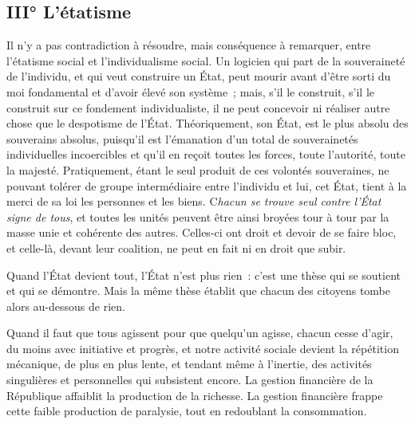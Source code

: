 \documentclass[french,twoside]{book} %
\newcommand{\astermono}{\medskip\centerline{\color{rubric}\large\selectfont{\syms ✻}}\medskip\par}%
\begin{document}
\astermono

\subsection[{III° L’étatisme}]{III° L’étatisme}
\noindent Il n’y a pas contradiction à résoudre, mais conséquence à remarquer, entre l’étatisme social et l’individualisme social. Un logicien qui part de la souveraineté de l’individu, et qui veut construire un État, peut mourir avant d’être sorti du moi fondamental et d’avoir élevé son système ; mais, s’il le construit, s’il le construit sur ce fondement individualiste, il ne peut concevoir ni réaliser autre chose que le despotisme de l’État. Théoriquement, son État, est le plus absolu des souverains absolus, puisqu’il est l’émanation d’un total de souverainetés individuelles incoercibles et qu’il en reçoit toutes les forces, toute l’autorité, toute la majesté. Pratiquement, étant le seul produit de ces volontés souveraines, ne pouvant tolérer de groupe intermédiaire entre l’individu et lui, cet État, tient à la merci de sa loi les personnes et les biens. C\emph{hacun se trouve seul contre l’État signe de tous}, et toutes les unités peuvent être ainsi broyées tour à tour par la masse unie et cohérente des autres. Celles-ci ont droit et devoir de se faire bloc, et celle-là, devant leur coalition, ne peut en fait ni en droit que subir.\par

\astermono

\noindent Quand l’État devient tout, l’État n’est plus rien : c’est une thèse qui se soutient et qui se démontre. Mais la même thèse établit que chacun des citoyens tombe alors au-dessous de rien.\par
Quand il faut que tous agissent pour que quelqu’un agisse, chacun cesse d’agir, du moins avec initiative et progrès, et notre activité sociale devient la répétition mécanique, de plus en plus lente, et tendant même à l’inertie, des activités singulières et personnelles qui subsistent encore. La gestion financière de la République affaiblit la production de la richesse. La gestion financière frappe cette faible production de paralysie, tout en redoublant la consommation.\par

\astermono
\end{document}
